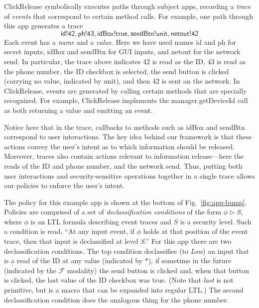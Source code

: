 \documentclass{llncs}
\newcommand{\code}[1]{\textsf{#1}} %
\newcommand{\toolname}{ClickRelease\xspace}
\newcommand{\tfuture}{\mathcal{F}}
\begin{document}
\toolname{} symbolically executes paths through subject apps, recording a
\emph{trace} of \emph{events} that correspond to certain method calls.
For example, one path through this app generates a trace
\begin{displaymath}
  \code{id!42}, \code{ph!43}, \code{idBox!true},
  \code{sendBtn!unit}, \code{netout!}\code{42}
\end{displaymath}
Each event has a \emph{name} and a \emph{value}. Here we have used
names \code{id} and \code{ph} for secret inputs, \code{idBox} and
\code{sendBtn} for GUI inputs, and \code{netout} for the network
send.  In particular, the trace above indicates 42 is read as the ID,
43 is read as the phone number, the ID checkbox is selected, the send
button is clicked (carrying no value, indicated by
\code{unit}), and then 42 is sent on the network. In \toolname{},
events are generated by calling certain methods that are specially
recognized. For example, \toolname{} implements the
\code{manager.getDeviceId} call as both returning a value and emitting
an event.

Notice here that in the trace, callbacks to methods such as
\code{idBox} and \code{sendBtn} correspond to user
interactions. The key idea behind our framework is that these actions
convey the user's intent as to which information should be
released. Moreover, traces also contain actions relevant to
information release---here the reads of the ID and phone number, and
the network send. Thus, putting both user interactions and
security-sensitive operations together in a single trace allows
our policies to enforce the user's intent.

The policy for
this example app is shown at the bottom of Fig.~\ref{fig:app-bump}.
Policies are comprised of a set of \emph{declassification
  conditions} of the form $\phi \rhd S$, where $\phi$ is an LTL
formula describing event traces and $S$ is a security level.  Such a
condition is read, ``At any input event, if $\phi$ holds at that
position of the event trace, then that input is declassified at level
$S$.''  For this app there are two declassification conditions. The
top condition declassifies (to \emph{Low}) an input that is a
read of the ID at any value (indicated by $\ast$), if
sometime in the future (indicated by the $\tfuture$ modality) the send
button is clicked and, when that button is clicked, the last value of
the ID checkbox was \code{true}. (Note that \emph{last} is not
primitive, but is a macro that can be expanded into regular LTL.)  The
second declassification condition does the analogous thing for the
phone number.
\end{document}
